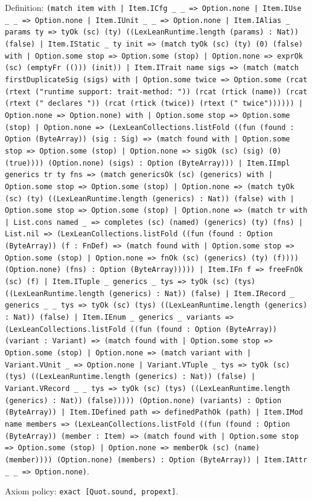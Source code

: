 \documentclass[11pt]{article}
\begin{document}
\noindent Definition: \texttt{(match item with | Item.ICfg \_ \_ => Option.none | Item.IUse \_ \_ => Option.none | Item.IUnit \_ \_ => Option.none | Item.IAlias \_ params ty => tyOk (sc) (ty) ((LexLeanRuntime.length (params) : Nat)) (false) | Item.IStatic \_ ty init => (match tyOk (sc) (ty) (0) (false) with | Option.some stop => Option.some (stop) | Option.none => exprOk (sc) (emptyFr (())) (init)) | Item.ITrait name sigs => (match (match firstDuplicateSig (sigs) with | Option.some twice => Option.some (rcat (rtext ("runtime support: trait-method: ")) (rcat (rtick (name)) (rcat (rtext (" declares ")) (rcat (rtick (twice)) (rtext (" twice")))))) | Option.none => Option.none) with | Option.some stop => Option.some (stop) | Option.none => (LexLeanCollections.listFold ((fun (found : Option (ByteArray)) (sig : Sig) => (match found with | Option.some stop => Option.some (stop) | Option.none => sigOk (sc) (sig) (0) (true)))) (Option.none) (sigs) : Option (ByteArray))) | Item.IImpl generics tr ty fns => (match genericsOk (sc) (generics) with | Option.some stop => Option.some (stop) | Option.none => (match tyOk (sc) (ty) ((LexLeanRuntime.length (generics) : Nat)) (false) with | Option.some stop => Option.some (stop) | Option.none => (match tr with | List.cons named \_ => completes (sc) (named) (generics) (ty) (fns) | List.nil => (LexLeanCollections.listFold ((fun (found : Option (ByteArray)) (f : FnDef) => (match found with | Option.some stop => Option.some (stop) | Option.none => fnOk (sc) (generics) (ty) (f)))) (Option.none) (fns) : Option (ByteArray))))) | Item.IFn f => freeFnOk (sc) (f) | Item.ITuple \_ generics \_ tys => tyOk (sc) (tys) ((LexLeanRuntime.length (generics) : Nat)) (false) | Item.IRecord \_ generics \_ \_ tys => tyOk (sc) (tys) ((LexLeanRuntime.length (generics) : Nat)) (false) | Item.IEnum \_ generics \_ variants => (LexLeanCollections.listFold ((fun (found : Option (ByteArray)) (variant : Variant) => (match found with | Option.some stop => Option.some (stop) | Option.none => (match variant with | Variant.VUnit \_ => Option.none | Variant.VTuple \_ tys => tyOk (sc) (tys) ((LexLeanRuntime.length (generics) : Nat)) (false) | Variant.VRecord \_ \_ tys => tyOk (sc) (tys) ((LexLeanRuntime.length (generics) : Nat)) (false))))) (Option.none) (variants) : Option (ByteArray)) | Item.IDefined path => definedPathOk (path) | Item.IMod name members => (LexLeanCollections.listFold ((fun (found : Option (ByteArray)) (member : Item) => (match found with | Option.some stop => Option.some (stop) | Option.none => memberOk (sc) (name) (member)))) (Option.none) (members) : Option (ByteArray)) | Item.IAttr \_ \_ => Option.none)}.\par
\noindent Axiom policy: \texttt{exact [Quot.sound, propext]}.\par
\end{document}
